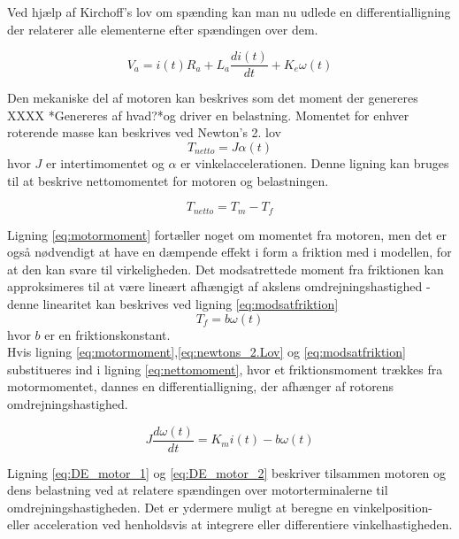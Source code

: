 Ved hjælp af Kirchoff's lov om spænding kan man nu udlede en differentialligning der relaterer alle elementerne efter spændingen over dem.

\begin{equation}\label{eq:DE_motor_1}
V_{a}=i(t)R_{a}+L_{a}\dfrac{di(t)}{dt}+K_{e}\omega(t)
\end{equation}

Den mekaniske del af motoren kan beskrives som det moment der genereres XXXX *Genereres af hvad?*og driver en belastning. Momentet for enhver roterende masse kan beskrives ved Newton's 2. lov \\
\begin{equation}\label{eq:newtons_2.Lov}
T_{netto}=J\alpha(t)
\end{equation}
hvor $J$ er intertimomentet og $\alpha$ er vinkelaccelerationen. Denne ligning kan bruges til at beskrive nettomomentet for motoren og belastningen. 

\begin{equation}\label{eq:nettomoment}
T_{netto}=T_{m}-T_{f}
\end{equation}

Ligning \ref{eq:motormoment} fortæller noget om momentet fra motoren, men det er også nødvendigt at have en dæmpende effekt i form a friktion med i modellen, for at den kan svare til virkeligheden. Det modsatrettede moment fra friktionen kan approksimeres til at være lineært afhængigt af akslens omdrejningshastighed - denne linearitet kan beskrives ved ligning \eqref{eq:modsatfriktion}
\begin{equation}\label{eq:modsatfriktion}
T_{f}=b\omega(t)
\end{equation}
hvor $b$ er en friktionskonstant.\\Hvis ligning \ref{eq:motormoment},\ref{eq:newtons_2.Lov} og \ref{eq:modsatfriktion} substitueres ind i ligning \ref{eq:nettomoment}, hvor et friktionsmoment trækkes fra motormomentet, dannes en differentialligning, der afhænger af rotorens omdrejningshastighed.

\begin{equation}\label{eq:DE_motor_2}
J\dfrac{d\omega(t)}{dt}=K_{m}i(t)-b\omega(t)
\end{equation}

Ligning \ref{eq:DE_motor_1} og \ref{eq:DE_motor_2} beskriver tilsammen motoren og dens belastning ved at relatere spændingen over motorterminalerne til omdrejningshastigheden. Det er ydermere muligt at beregne en vinkelposition- eller acceleration ved henholdsvis at integrere eller differentiere vinkelhastigheden.


